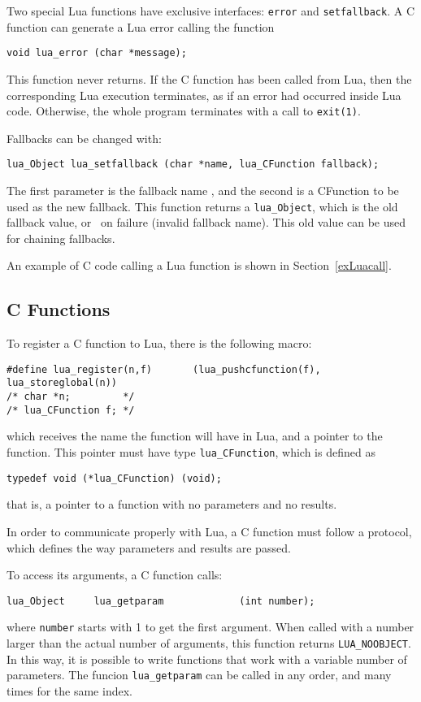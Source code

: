 Two special Lua functions have exclusive interfaces:
\verb'error' and \verb'setfallback'.
A C function can generate a Lua error calling the function
\begin{verbatim}
void lua_error (char *message);
\end{verbatim}
This function never returns.
If the C function has been called from Lua,
then the corresponding Lua execution terminates,
as if an error had occurred inside Lua code.
Otherwise, the whole program terminates with a call to \verb|exit(1)|.

Fallbacks can be changed with:
\begin{verbatim}
lua_Object lua_setfallback (char *name, lua_CFunction fallback);
\end{verbatim}
The first parameter is the fallback name ,
and the second is a CFunction to be used as the new fallback.
This function returns a \verb'lua_Object',
which is the old fallback value,
or \nil\ on failure (invalid fallback name).
This old value can be used for chaining fallbacks.

An example of C code calling a Lua function is shown in
Section~\ref{exLuacall}.


\subsection{C Functions} \label{LuacallC}
To register a C function to Lua,
there is the following macro:
\begin{verbatim}
#define lua_register(n,f)       (lua_pushcfunction(f), lua_storeglobal(n))
/* char *n;         */
/* lua_CFunction f; */
\end{verbatim}
which receives the name the function will have in Lua,
and a pointer to the function.
This pointer must have type \verb'lua_CFunction',
which is defined as
\begin{verbatim}
typedef void (*lua_CFunction) (void);
\end{verbatim}
that is, a pointer to a function with no parameters and no results.

In order to communicate properly with Lua,
a C function must follow a protocol,
which defines the way parameters and results are passed.

To access its arguments, a C function calls:
\begin{verbatim}
lua_Object     lua_getparam             (int number);
\end{verbatim}
where \verb'number' starts with 1 to get the first argument.
When called with a number larger than the actual number of arguments,
this function returns
\verb'LUA_NOOBJECT'.
In this way, it is possible to write functions that work with
a variable number of parameters.
The funcion \verb|lua_getparam| can be called in any order,
and many times for the same index.

